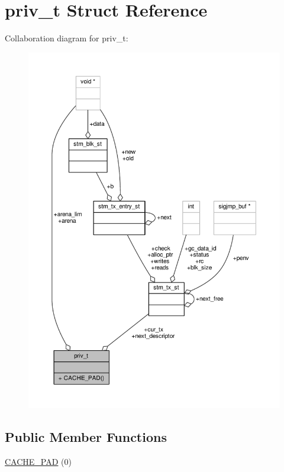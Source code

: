 \hypertarget{structpriv__t}{\section{priv\-\_\-t Struct Reference}
\label{structpriv__t}
}


Collaboration diagram for priv\-\_\-t\-:
\nopagebreak
\begin{figure}[H]
\begin{center}
\leavevmode
\includegraphics[width=350pt]{structpriv__t__coll__graph}
\end{center}
\end{figure}
\subsection*{Public Member Functions}
\begin{DoxyCompactItemize}
\item 
\hyperlink{structpriv__t_a615cb155fb70edc886a8516a1b5d6f97}{C\-A\-C\-H\-E\-\_\-\-P\-A\-D} (0)
\end{DoxyCompactItemize}
